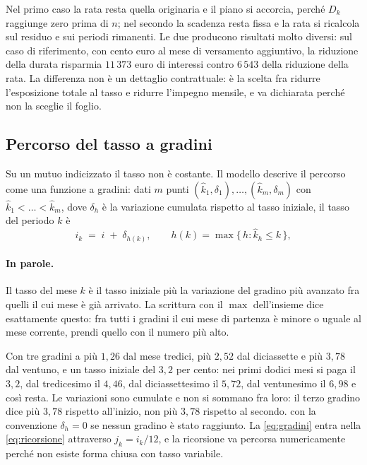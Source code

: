 \documentclass[11pt,a4paper]{article}
\theoremstyle{definition}
\theoremstyle{plain}
\begin{document}
Nel primo caso la rata resta quella originaria e il piano si accorcia, perché $D_k$ raggiunge zero prima di $n$; nel secondo la scadenza resta fissa e la rata si ricalcola sul residuo e sui periodi rimanenti. Le due producono risultati molto diversi: sul caso di riferimento, con cento euro al mese di versamento aggiuntivo, la riduzione della durata risparmia $11\,373$ euro di interessi contro $6\,543$ della riduzione della rata. La differenza non è un dettaglio contrattuale: è la scelta fra ridurre l'esposizione totale al tasso e ridurre l'impegno mensile, e va dichiarata perché non la sceglie il foglio.

\subsection{Percorso del tasso a gradini}

Su un mutuo indicizzato il tasso non è costante. Il modello descrive il percorso come una funzione a gradini: dati $m$ punti $(\hat{k}_1,\delta_1),\dots,(\hat{k}_m,\delta_m)$ con $\hat{k}_1<\dots<\hat{k}_m$, dove $\delta_h$ è la variazione cumulata rispetto al tasso iniziale, il tasso del periodo $k$ è
\begin{equation}
i_k \;=\; i \;+\; \delta_{h(k)},
\qquad
h(k) = \max\{\,h : \hat{k}_h \le k\,\},
\label{eq:gradini}
\end{equation}

\paragraph{In parole.} Il tasso del mese $k$ è il tasso iniziale più la variazione del gradino più avanzato fra quelli il cui mese è già arrivato. La scrittura con il $\max$ dell'insieme dice esattamente questo: fra tutti i gradini il cui mese di partenza è minore o uguale al mese corrente, prendi quello con il numero più alto.

Con tre gradini a più $1{,}26$ dal mese tredici, più $2{,}52$ dal diciassette e più $3{,}78$ dal ventuno, e un tasso iniziale del $3{,}2$ per cento: nei primi dodici mesi si paga il $3{,}2$, dal tredicesimo il $4{,}46$, dal diciassettesimo il $5{,}72$, dal ventunesimo il $6{,}98$ e così resta. Le variazioni sono cumulate e non si sommano fra loro: il terzo gradino dice più $3{,}78$ rispetto all'inizio, non più $3{,}78$ rispetto al secondo.
con la convenzione $\delta_{h}=0$ se nessun gradino è stato raggiunto. La \eqref{eq:gradini} entra nella \eqref{eq:ricorsione} attraverso $j_k = i_k/12$, e la ricorsione va percorsa numericamente perché non esiste forma chiusa con tasso variabile.
\end{document}
